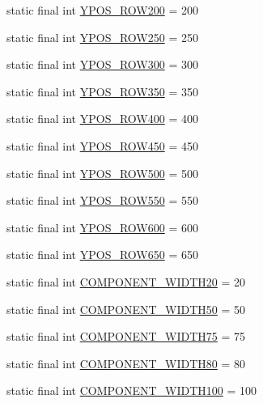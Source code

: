 \begin{DoxyCompactItemize}
\item 
static final int \hyperlink{class_display_1_1_display_af186989bbcc82bddc811ce9727cb1d4d}{Y\+P\+O\+S\+\_\+\+R\+O\+W200} = 200
\item 
static final int \hyperlink{class_display_1_1_display_a76fe305a0d851cc121da69952ee13b00}{Y\+P\+O\+S\+\_\+\+R\+O\+W250} = 250
\item 
static final int \hyperlink{class_display_1_1_display_aaf16f1b813645dc5969d6547d7947b3a}{Y\+P\+O\+S\+\_\+\+R\+O\+W300} = 300
\item 
static final int \hyperlink{class_display_1_1_display_ad479e849d0564e40118e7d76652d9ffa}{Y\+P\+O\+S\+\_\+\+R\+O\+W350} = 350
\item 
static final int \hyperlink{class_display_1_1_display_a30efc4ca7cf960942741ac557862fbc8}{Y\+P\+O\+S\+\_\+\+R\+O\+W400} = 400
\item 
static final int \hyperlink{class_display_1_1_display_a68978a2870b55dbd8b5ab6d93db2ed79}{Y\+P\+O\+S\+\_\+\+R\+O\+W450} = 450
\item 
static final int \hyperlink{class_display_1_1_display_af69167585902297bf72bccb89eac59ad}{Y\+P\+O\+S\+\_\+\+R\+O\+W500} = 500
\item 
static final int \hyperlink{class_display_1_1_display_a18e8f506bdeb1ffce18d4e17eacfc1c9}{Y\+P\+O\+S\+\_\+\+R\+O\+W550} = 550
\item 
static final int \hyperlink{class_display_1_1_display_aeb7358eb4ef9314e129e3636eaee48b2}{Y\+P\+O\+S\+\_\+\+R\+O\+W600} = 600
\item 
static final int \hyperlink{class_display_1_1_display_a60296fc1277e58422d02f8f462ad95c5}{Y\+P\+O\+S\+\_\+\+R\+O\+W650} = 650
\item 
static final int \hyperlink{class_display_1_1_display_af02e2130bca24f14a40c4d5c15712b94}{C\+O\+M\+P\+O\+N\+E\+N\+T\+\_\+\+W\+I\+D\+T\+H20} = 20
\item 
static final int \hyperlink{class_display_1_1_display_abad2084dbebbb332775a53c5a79fb055}{C\+O\+M\+P\+O\+N\+E\+N\+T\+\_\+\+W\+I\+D\+T\+H50} = 50
\item 
static final int \hyperlink{class_display_1_1_display_a357b313cc7372c3fce2808f738c26369}{C\+O\+M\+P\+O\+N\+E\+N\+T\+\_\+\+W\+I\+D\+T\+H75} = 75
\item 
static final int \hyperlink{class_display_1_1_display_a42b05e8c9ef5a9a34a30dd19412e22e0}{C\+O\+M\+P\+O\+N\+E\+N\+T\+\_\+\+W\+I\+D\+T\+H80} = 80
\item 
static final int \hyperlink{class_display_1_1_display_a4cb90de4566da894b505b11cf51781ae}{C\+O\+M\+P\+O\+N\+E\+N\+T\+\_\+\+W\+I\+D\+T\+H100} = 100

\end{DoxyCompactItemize}
